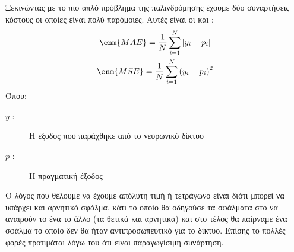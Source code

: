 Ξεκινώντας με το πιο απλό πρόβλημα της παλινδρόμησης έχουμε δύο συναρτήσεις κόστους οι οποίες είναι πολύ παρόμοιες. Αυτές είναι οι  και :
\begin{gather*}
    \enm{MAE}=\frac{1}{N}\sum\limits_{i=1}^{N}\left\lvert y_i-p_i\right\rvert \\
    \enm{MSE}=\frac{1}{N}\sum\limits_{i=1}^{N}\left( y_i-p_i\right)^2
\end{gather*}
Όπου:
\begin{description}
    \item[$y$ :] Η έξοδος που παράχθηκε από το νευρωνικό δίκτυο
    \item[$p$ :] Η πραγματική έξοδος
\end{description}
Ό λόγος που θέλουμε να έχουμε απόλυτη τιμή ή τετράγωνο είναι διότι μπορεί να υπάρχει και αρνητικό σφάλμα, κάτι το οποίο θα οδηγούσε τα σφάλματα στο να αναιρούν το ένα το άλλο (τα θετικά και αρνητικά) και στο τέλος θα παίρναμε ένα σφάλμα το
οποίο δεν θα ήταν αντιπροσωπευτικό για το δίκτυο. Επίσης το  πολλές φορές προτιμάται λόγω του ότι είναι παραγωγίσιμη συνάρτηση.


